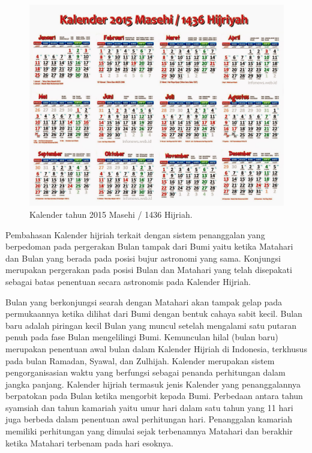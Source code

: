    \begin{figure}[ht]
    \centerline{\includegraphics[width=1\textwidth]{figures/Kalender_2015.JPG}}
    \caption{Kalender tahun 2015 Masehi / 1436 Hijriah.}
    \label{Kalender_2015}
    \end{figure}

    Pembahasan Kalender hijriah terkait dengan sistem penanggalan yang berpedoman pada pergerakan Bulan tampak dari Bumi yaitu ketika Matahari dan Bulan yang berada pada posisi bujur astronomi yang sama. Konjungsi merupakan pergerakan pada posisi Bulan dan Matahari yang telah disepakati sebagai batas penentuan secara astronomis pada Kalender Hijriah.

  Bulan yang berkonjungsi searah dengan Matahari akan tampak gelap pada permukaannya ketika dilihat dari Bumi dengan bentuk cahaya sabit kecil. Bulan baru adalah piringan kecil Bulan yang muncul setelah mengalami satu putaran penuh pada fase Bulan mengelilingi Bumi.
  Kemunculan hilal (bulan baru) merupakan penentuan awal bulan dalam Kalender Hijriah di Indonesia, terkhusus pada bulan Ramadan, Syawal, dan Zulhijah. Kalender merupakan sistem pengorganisasian waktu yang berfungsi sebagai penanda perhitungan dalam jangka panjang. Kalender hijriah termasuk jenis Kalender yang penanggalannya berpatokan pada Bulan ketika mengorbit kepada Bumi.
  Perbedaan antara tahun syamsiah dan tahun kamariah yaitu umur hari dalam satu tahun yang 11 hari juga berbeda dalam penentuan awal perhitungan hari. Penanggalan kamariah memiliki perhitungan yang dimulai sejak terbenamnya Matahari dan berakhir ketika Matahari terbenam pada hari esoknya.

